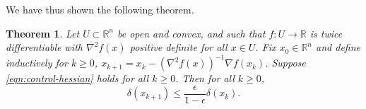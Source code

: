 \documentclass[11pt]{article}
\newcommand{\R}{\mathbb{R}}
\newtheorem{theorem}{Theorem}[section]
\begin{document}
We have thus shown the following theorem.

\begin{theorem}
Let $U\subset\R^n$ be open and convex, and such that $f:U\rightarrow \R$ is twice differentiable with $\nabla^2 f(x)$ positive definite for all $x\in U$. Fix $x_0\in\R^n$ and define inductively for $k\ge 0$, $x_{k+1} = x_k - (\nabla^2 f(x))^{-1} \nabla f(x_k)$. Suppose \eqref{eqn:control-hessian} holds for all $k\ge 0$. Then for all $k\ge 0$,
$$
\delta(x_{k+1}) \le \frac{\epsilon}{1-\epsilon}\delta(x_k) .
$$
\end{theorem}
\end{document}
